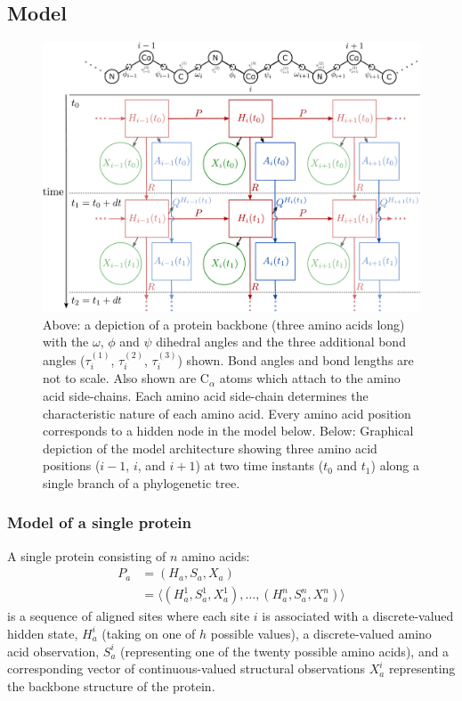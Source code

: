 \documentclass[nogrid]{MBE}%
\begin{document}
\subsection{Model}
\begin{figure}
	\centering
	\includegraphics[width=2.0\columnwidth]{figures/model-structure-final.pdf}
	\caption{Above: a depiction of a protein backbone (three amino acids long) with the $\omega$, $\phi$ and $\psi$ dihedral angles and the three additional bond angles ($\tau^{(1)}_{i}$, $\tau^{(2)}_{i}$, $\tau^{(3)}_{i}$) shown. Bond angles and bond lengths are not to scale. Also shown are $\text{C}_{\alpha}$ atoms which attach to the amino acid side-chains. Each amino acid side-chain determines the characteristic nature of each amino acid. Every amino acid position corresponds to a hidden node in the model below.\newline
	Below: Graphical depiction of the model architecture showing three amino acid positions ($i-1$, $i$, and $i+1$) at two time instants ($t_0$ and $t_1$) along a single branch of a phylogenetic tree.}%
	\label{fig:model-structure}%
\end{figure}

\subsubsection{Model of a single protein}
A single protein consisting of $n$ amino acids:
\begin{align*}
 P_a  & = (H_a, S_a,X_a)\\
 & =\langle (H^{1}_a, S^{1}_a,X^{1}_a),\ldots,(H^{n}_a, S^{n}_a,X^{n}_a) \rangle
\end{align*}
is a sequence of aligned sites where each site $i$ is associated with a discrete-valued hidden state, $H_a^{i}$ (taking on one of $h$ possible values), a discrete-valued amino acid observation, $S_a^{i}$ (representing one of the twenty possible amino acids), and a corresponding vector of continuous-valued structural observations $X_a^{i}$ representing the backbone structure of the protein.
\end{document}
